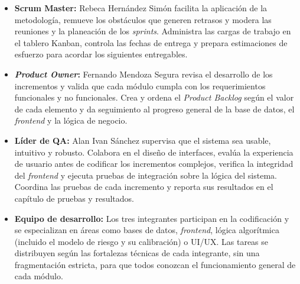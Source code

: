 \begin{itemize}
    \item \textbf{Scrum Master:} Rebeca Hernández Simón facilita la aplicación de la metodología, remueve los obstáculos que generen retrasos y modera las reuniones y la planeación de los \textit{sprints}. Administra las cargas de trabajo en el tablero Kanban, controla las fechas de entrega y prepara estimaciones de esfuerzo para acordar los siguientes entregables.
    \item \textbf{\textit{Product Owner}:} Fernando Mendoza Segura revisa el desarrollo de los incrementos y valida que cada módulo cumpla con los requerimientos funcionales y no funcionales. Crea y ordena el \textit{Product Backlog} según el valor de cada elemento y da seguimiento al progreso general de la base de datos, el \textit{frontend} y la lógica de negocio.
    \item \textbf{Líder de QA:} Alan Ivan Sánchez supervisa que el sistema sea usable, intuitivo y robusto. Colabora en el diseño de interfaces, evalúa la experiencia de usuario antes de codificar los incrementos complejos, verifica la integridad del \textit{frontend} y ejecuta pruebas de integración sobre la lógica del sistema. Coordina las pruebas de cada incremento y reporta sus resultados en el capítulo de pruebas y resultados.
    \item \textbf{Equipo de desarrollo:} Los tres integrantes participan en la codificación y se especializan en áreas como bases de datos, \textit{frontend}, lógica algorítmica (incluido el modelo de riesgo y su calibración) o UI/UX. Las tareas se distribuyen según las fortalezas técnicas de cada integrante, sin una fragmentación estricta, para que todos conozcan el funcionamiento general de cada módulo.
\end{itemize}
